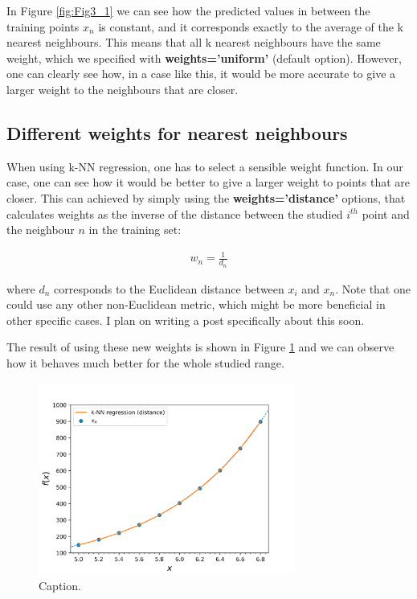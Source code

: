 \documentclass{article}%
\begin{document}
In Figure \ref{fig:Fig3_1} we can see how the predicted values in between the training points $x_n$ is constant, and it corresponds exactly to the average of the k nearest neighbours. This means that all k nearest neighbours have the same weight, which we specified with \textbf{weights='uniform'} (default option). However, one can clearly see how, in a case like this, it would be more accurate to give a larger weight to the neighbours that are closer.

\subsection{Different weights for nearest neighbours}
When using k-NN regression, one has to select a sensible weight function. In our case, one can see how it would be better to give a larger weight to points that are closer. This can achieved by simply using the \textbf{weights='distance'} options, that calculates weights as the inverse of the distance between the studied $i^{th}$ point and the neighbour $n$ in the training set:

\begin{align}
w_n = \frac{1}{d_n}
\label{eqn:weight_distance}
\end{align}

\noindent where $d_n$ corresponds to the Euclidean distance between $x_i$ and $x_n$. Note that one could use any other non-Euclidean metric, which might be more beneficial in other specific cases. I plan on writing a post specifically about this soon.

The result of using these new weights is shown in Figure \ref{fig:Fig3_2} and we can observe how it behaves much better for the whole studied range.

\begin{figure}[!htbp]
	\centering
	\includegraphics[width=0.75\textwidth]{figures/Fig3_2.png}
	\caption{Caption.}
	\label{fig:Fig3_2}
\end{figure}
\end{document}
